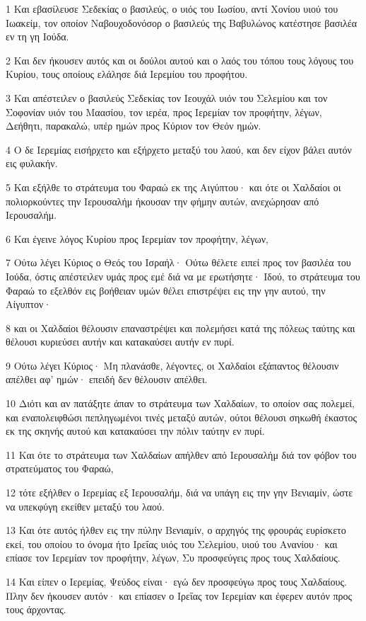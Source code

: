 \par 1 Και εβασίλευσε Σεδεκίας ο βασιλεύς, ο υιός του Ιωσίου, αντί Χονίου υιού του Ιωακείμ, τον οποίον Ναβουχοδονόσορ ο βασιλεύς της Βαβυλώνος κατέστησε βασιλέα εν τη γη Ιούδα.
\par 2 Και δεν ήκουσεν αυτός και οι δούλοι αυτού και ο λαός του τόπου τους λόγους του Κυρίου, τους οποίους ελάλησε διά Ιερεμίου του προφήτου.
\par 3 Και απέστειλεν ο βασιλεύς Σεδεκίας τον Ιεουχάλ υιόν του Σελεμίου και τον Σοφονίαν υιόν του Μαασίου, τον ιερέα, προς Ιερεμίαν τον προφήτην, λέγων, Δεήθητι, παρακαλώ, υπέρ ημών προς Κύριον τον Θεόν ημών.
\par 4 Ο δε Ιερεμίας εισήρχετο και εξήρχετο μεταξύ του λαού, και δεν είχον βάλει αυτόν εις φυλακήν.
\par 5 Και εξήλθε το στράτευμα του Φαραώ εκ της Αιγύπτου· και ότε οι Χαλδαίοι οι πολιορκούντες την Ιερουσαλήμ ήκουσαν την φήμην αυτών, ανεχώρησαν από Ιερουσαλήμ.
\par 6 Και έγεινε λόγος Κυρίου προς Ιερεμίαν τον προφήτην, λέγων,
\par 7 Ούτω λέγει Κύριος ο Θεός του Ισραήλ· Ούτω θέλετε ειπεί προς τον βασιλέα του Ιούδα, όστις απέστειλεν υμάς προς εμέ διά να με ερωτήσητε· Ιδού, το στράτευμα του Φαραώ το εξελθόν εις βοήθειαν υμών θέλει επιστρέψει εις την γην αυτού, την Αίγυπτον·
\par 8 και οι Χαλδαίοι θέλουσιν επαναστρέψει και πολεμήσει κατά της πόλεως ταύτης και θέλουσι κυριεύσει αυτήν και κατακαύσει αυτήν εν πυρί.
\par 9 Ούτω λέγει Κύριος· Μη πλανάσθε, λέγοντες, οι Χαλδαίοι εξάπαντος θέλουσιν απέλθει αφ' ημών· επειδή δεν θέλουσιν απέλθει.
\par 10 Διότι και αν πατάξητε άπαν το στράτευμα των Χαλδαίων, το οποίον σας πολεμεί, και εναπολειφθώσι πεπληγωμένοι τινές μεταξύ αυτών, ούτοι θέλουσι σηκωθή έκαστος εκ της σκηνής αυτού και κατακαύσει την πόλιν ταύτην εν πυρί.
\par 11 Και ότε το στράτευμα των Χαλδαίων απήλθεν από Ιερουσαλήμ διά τον φόβον του στρατεύματος του Φαραώ,
\par 12 τότε εξήλθεν ο Ιερεμίας εξ Ιερουσαλήμ, διά να υπάγη εις την γην Βενιαμίν, ώστε να υπεκφύγη εκείθεν μεταξύ του λαού.
\par 13 Και ότε αυτός ήλθεν εις την πύλην Βενιαμίν, ο αρχηγός της φρουράς ευρίσκετο εκεί, του οποίου το όνομα ήτο Ιρεΐας υιός του Σελεμίου, υιού του Ανανίου· και επίασε τον Ιερεμίαν τον προφήτην, λέγων, Συ προσφεύγεις προς τους Χαλδαίους.
\par 14 Και είπεν ο Ιερεμίας, Ψεύδος είναι· εγώ δεν προσφεύγω προς τους Χαλδαίους. Πλην δεν ήκουσεν αυτόν· και επίασεν ο Ιρεΐας τον Ιερεμίαν και έφερεν αυτόν προς τους άρχοντας.
